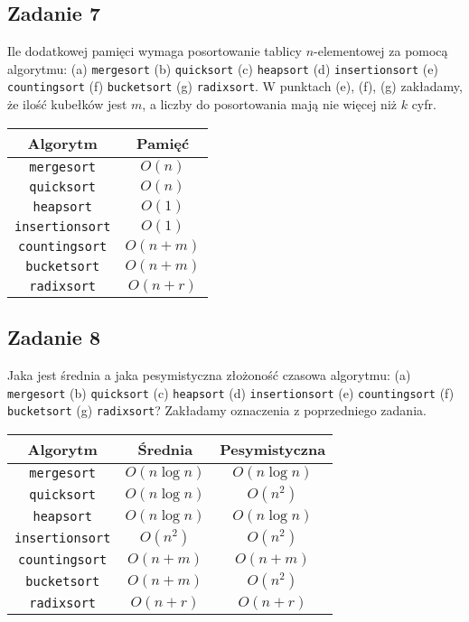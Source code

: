 \documentclass{article}
\begin{document}
\subsection*{Zadanie 7}
Ile dodatkowej pamięci wymaga posortowanie tablicy $n$-elementowej za pomocą
algorytmu: (a) \verb+mergesort+ (b) \verb+quicksort+ (c) \verb+heapsort+ (d) \verb+insertionsort+ (e) \verb+countingsort+
(f) \verb+bucketsort+ (g) \verb+radixsort+. W punktach (e), (f), (g) zakładamy, że ilość kubełków
jest $m$, a liczby do posortowania mają nie więcej niż $k$ cyfr.
\begin{center}
    \begin{tabular}{c c}
        \textbf{Algorytm}    & \textbf{Pamięć} \\
        \hline
        \verb+mergesort+     & $O(n)$          \\
        \verb+quicksort+     & $O(n)$          \\
        \verb+heapsort+      & $O(1)$          \\
        \verb+insertionsort+ & $O(1)$          \\
        \verb+countingsort+  & $O(n+m)$        \\
        \verb+bucketsort+    & $O(n+m)$        \\
        \verb+radixsort+     & $O(n+r)$
    \end{tabular}
\end{center}

\subsection*{Zadanie 8}
Jaka jest średnia a jaka pesymistyczna złożoność czasowa algorytmu: (a) \verb+mergesort+ (b) \verb+quicksort+
(c) \verb+heapsort+ (d) \verb+insertionsort+ (e) \verb+countingsort+ (f) \verb+bucketsort+ (g) \verb+radixsort+?
Zakładamy oznaczenia z poprzedniego zadania.
\begin{center}
    \begin{tabular}{c c c}
        \textbf{Algorytm}    & \textbf{Średnia} & \textbf{Pesymistyczna} \\
        \hline
        \verb+mergesort+     & $O(n \log n)$    & $O(n \log n)$          \\
        \verb+quicksort+     & $O(n \log n)$    & $O(n^2)$               \\
        \verb+heapsort+      & $O(n \log n)$    & $O(n \log n)$          \\
        \verb+insertionsort+ & $O(n^2)$         & $O(n^2)$               \\
        \verb+countingsort+  & $O(n+m)$         & $O(n+m)$               \\
        \verb+bucketsort+    & $O(n+m)$         & $O(n^2)$               \\
        \verb+radixsort+     & $O(n+r)$         & $O(n+r)$
    \end{tabular}
\end{center}
\end{document}

